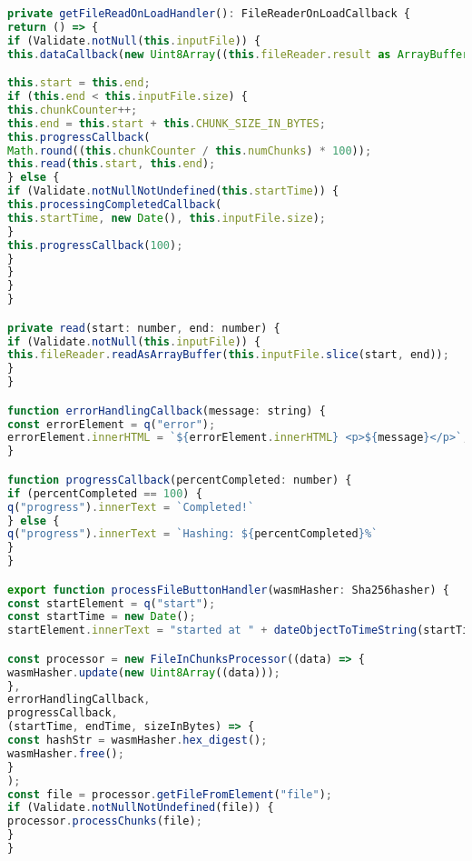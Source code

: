 \begin{lstlisting}[language=Javascript]
private getFileReadOnLoadHandler(): FileReaderOnLoadCallback {
return () => {
if (Validate.notNull(this.inputFile)) {
this.dataCallback(new Uint8Array((this.fileReader.result as ArrayBuffer)));

this.start = this.end;
if (this.end < this.inputFile.size) {
this.chunkCounter++;
this.end = this.start + this.CHUNK_SIZE_IN_BYTES;
this.progressCallback(
Math.round((this.chunkCounter / this.numChunks) * 100));
this.read(this.start, this.end);
} else {
if (Validate.notNullNotUndefined(this.startTime)) {
this.processingCompletedCallback(
this.startTime, new Date(), this.inputFile.size);
}
this.progressCallback(100);
}
}
}
}

private read(start: number, end: number) {
if (Validate.notNull(this.inputFile)) {
this.fileReader.readAsArrayBuffer(this.inputFile.slice(start, end));
}
}

function errorHandlingCallback(message: string) {
const errorElement = q("error");
errorElement.innerHTML = `${errorElement.innerHTML} <p>${message}</p>`;
}

function progressCallback(percentCompleted: number) {
if (percentCompleted == 100) {
q("progress").innerText = `Completed!`
} else {
q("progress").innerText = `Hashing: ${percentCompleted}%`
}
}

export function processFileButtonHandler(wasmHasher: Sha256hasher) {
const startElement = q("start");
const startTime = new Date();
startElement.innerText = "started at " + dateObjectToTimeString(startTime);

const processor = new FileInChunksProcessor((data) => {
wasmHasher.update(new Uint8Array((data)));
},
errorHandlingCallback,
progressCallback,
(startTime, endTime, sizeInBytes) => {
const hashStr = wasmHasher.hex_digest();
wasmHasher.free();
}
);
const file = processor.getFileFromElement("file");
if (Validate.notNullNotUndefined(file)) {
processor.processChunks(file);
}
}
\end{lstlisting}
